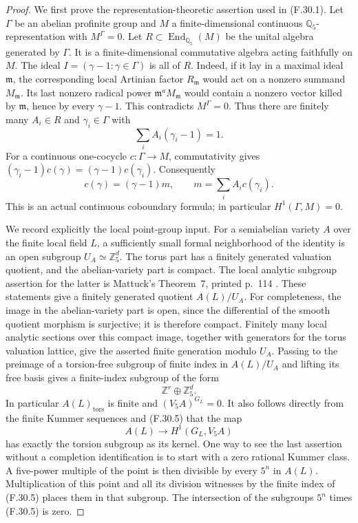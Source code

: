 \begin{proof}
We first prove the representation-theoretic assertion
used in (F.30.1).
Let $\Gamma$ be an abelian profinite group and $M$ a
finite-dimensional continuous $\mathbb Q_5$-representation
with $M^\Gamma=0$.
Let $R\subset\operatorname{End}_{\mathbb Q_5}(M)$ be the
unital algebra generated by $\Gamma$.
It is a finite-dimensional commutative algebra acting
faithfully on $M$.  The ideal
$I=(\gamma-1:\gamma\in\Gamma)$ is all of $R$.
Indeed, if it lay in a maximal ideal $\mathfrak m$,
the corresponding local Artinian factor $R_{\mathfrak m}$
would act on a nonzero summand $M_{\mathfrak m}$.
Its last nonzero radical power
$\mathfrak m^aM_{\mathfrak m}$ would contain a nonzero
vector killed by $\mathfrak m$, hence by every $\gamma-1$.
This contradicts $M^\Gamma=0$.
Thus there are finitely many $A_i\in R$ and
$\gamma_i\in\Gamma$ with
\[
                  \sum_i A_i(\gamma_i-1)=1.
\]
For a continuous one-cocycle $c:\Gamma\to M$,
commutativity gives
$(\gamma_i-1)c(\gamma)=(\gamma-1)c(\gamma_i)$.
Consequently
\[
 c(\gamma)=(\gamma-1)m,\qquad
                 m=\sum_iA_ic(\gamma_i).
                                                        \tag{F.30.4}
\]
This is an actual continuous coboundary formula;
in particular $H^1(\Gamma,M)=0$.

We record explicitly the local point-group input.
For a semiabelian variety $A$ over the finite local
field $L$, a sufficiently small formal neighborhood
of the identity is an open subgroup
$U_A\simeq\mathbb Z_5^d$.
The torus part has a finitely generated valuation
quotient, and the abelian-variety part is compact.
The local analytic subgroup assertion for the latter
is Mattuck's Theorem~7, printed p.~114
\cite{BC_Mattuck1955}.
These statements give a finitely generated quotient
$A(L)/U_A$.
For completeness, the image in the abelian-variety
part is open, since the differential of the smooth
quotient morphism is surjective; it is therefore
compact. Finitely many local analytic sections over
this compact image, together with generators for the
torus valuation lattice, give the asserted finite
generation modulo $U_A$.
Passing to the preimage of a torsion-free subgroup
of finite index in $A(L)/U_A$ and lifting its free
basis gives a finite-index subgroup of the form
\[
                       \mathbb Z^r\oplus\mathbb Z_5^d.
                                                        \tag{F.30.5}
\]
In particular $A(L)_{\mathrm{tors}}$ is finite and
$(V_5A)^{G_L}=0$.
It also follows directly from the finite Kummer
sequences and (F.30.5) that the map
\[
                   A(L)\longrightarrow H^1(G_L,V_5A)
                                                        \tag{F.30.6}
\]
has exactly the torsion subgroup as its kernel.
One way to see the last assertion without a completion
identification is to start with a zero rational Kummer
class. A five-power multiple of the point is then
divisible by every $5^n$ in $A(L)$.
Multiplication of this point and all its division
witnesses by the finite index of (F.30.5) places
them in that subgroup.
The intersection of the subgroups $5^n$ times
(F.30.5) is zero.


\end{proof}
